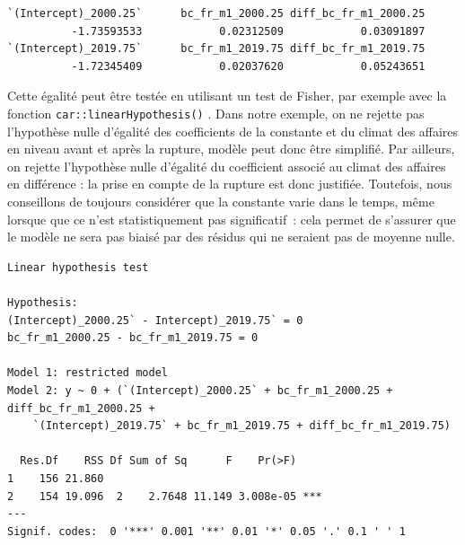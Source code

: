 \documentclass[
  a4paper,
  DIV=11,
  numbers=noendperiod,
  french]{scrartcl}
\newenvironment{Shaded}{\begin{snugshade}}{\end{snugshade}}
\newcommand{\AttributeTok}[1]{\textcolor[rgb]{0.40,0.45,0.13}{#1}}
\newcommand{\FunctionTok}[1]{\textcolor[rgb]{0.28,0.35,0.67}{#1}}
\newcommand{\NormalTok}[1]{\textcolor[rgb]{0.00,0.23,0.31}{#1}}
\newcommand{\SpecialCharTok}[1]{\textcolor[rgb]{0.37,0.37,0.37}{#1}}
\newcommand{\StringTok}[1]{\textcolor[rgb]{0.13,0.47,0.30}{#1}}
\newcommand\1{{\mathds 1}}
\theoremstyle{remark}
\begin{document}
\begin{verbatim}
`(Intercept)_2000.25`      bc_fr_m1_2000.25 diff_bc_fr_m1_2000.25 
          -1.73593533            0.02312509            0.03091897 
`(Intercept)_2019.75`      bc_fr_m1_2019.75 diff_bc_fr_m1_2019.75 
          -1.72345409            0.02037620            0.05243651 
\end{verbatim}

Cette égalité peut être testée en utilisant un test de Fisher, par
exemple avec la fonction \texttt{car::linearHypothesis()}
\autocite{car}. Dans notre exemple, on ne rejette pas l'hypothèse nulle
d'égalité des coefficients de la constante et du climat des affaires en
niveau avant et après la rupture, modèle peut donc être simplifié. Par
ailleurs, on rejette l'hypothèse nulle d'égalité du coefficient associé
au climat des affaires en différence : la prise en compte de la rupture
est donc justifiée. Toutefois, nous conseillons de toujours considérer
que la constante varie dans le temps, même lorsque que ce n'est
statistiquement pas significatif~: cela permet de s'assurer que le
modèle ne sera pas biaisé par des résidus qui ne seraient pas de moyenne
nulle.

\begin{Shaded}
\end{Shaded}

\begin{verbatim}
Linear hypothesis test

Hypothesis:
(Intercept)_2000.25` - Intercept)_2019.75` = 0
bc_fr_m1_2000.25 - bc_fr_m1_2019.75 = 0

Model 1: restricted model
Model 2: y ~ 0 + (`(Intercept)_2000.25` + bc_fr_m1_2000.25 + diff_bc_fr_m1_2000.25 + 
    `(Intercept)_2019.75` + bc_fr_m1_2019.75 + diff_bc_fr_m1_2019.75)

  Res.Df    RSS Df Sum of Sq      F    Pr(>F)    
1    156 21.860                                  
2    154 19.096  2    2.7648 11.149 3.008e-05 ***
---
Signif. codes:  0 '***' 0.001 '**' 0.01 '*' 0.05 '.' 0.1 ' ' 1
\end{verbatim}
\end{document}
